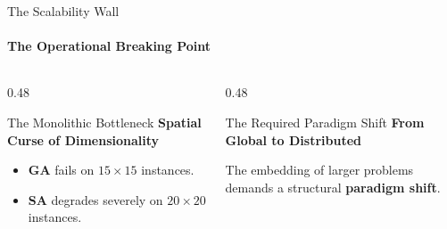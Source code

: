 \documentclass[10pt, aspectratio=169]{beamer}
\begin{document}
\begin{frame}{The Scalability Wall}
    \framesubtitle{The Operational Breaking Point}
    
    \vspace{0.4cm}
    
    \begin{columns}[T]
        
        \begin{column}{0.48\textwidth}
            \begin{block}{The Monolithic Bottleneck}
                \vspace{0.2cm}
                \centering
                \textbf{Spatial Curse of Dimensionality}\\[0.3cm]
                \raggedright
                \vspace{0.2cm}
                \begin{itemize}
                    \item \textbf{GA} fails on $15 \times 15$ instances.
                    \item \textbf{SA} degrades severely on $20 \times 20$ instances.
                \end{itemize}
                \vspace{0.2cm}
            \end{block}
        \end{column}
        
        \begin{column}{0.48\textwidth}
            \begin{block}{The Required Paradigm Shift}
                \vspace{0.2cm}
                \centering
                \textbf{From Global to Distributed}\\[0.3cm]
                \raggedright
            The embedding of larger problems demands a structural \textbf{paradigm shift}.\\
                
                \vspace{0.55cm} %
            \end{block}
        \end{column}
        
    \end{columns}
    
\end{frame}
\end{document}
